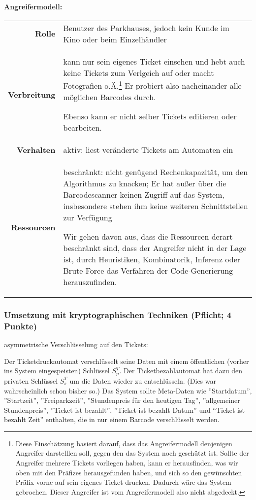 \documentclass{article}
\begin{document}
\paragraph{Angreifermodell:}
\begin{center}
	\begin{savenotes}	%
		\begin{tabular}{rp{}}
			\textbf{Rolle}			&	Benutzer des Parkhauses, jedoch kein Kunde im Kino oder beim Einzelhändler	\\
			\textbf{Verbreitung}	&	kann nur sein eigenes Ticket einsehen und hebt auch keine Tickets zum Verlgeich auf oder macht Fotografien o.Ä.\footnote{
											Diese Einschätzung basiert darauf, dass das Angreifermodell denjenigen Angreifer darstelllen soll, gegen den das System noch geschützt ist.
											Sollte der Angreifer mehrere Tickets vorliegen haben, kann er herausfinden, was wir oben mit den Präfizes herausgefunden haben, und sich so den gewünschten Präfix vorne auf sein eigenes Ticket drucken.
											Dadurch wäre das System gebrochen.
											Dieser Angreifer ist vom Angreifermodell also nicht abgedeckt.
										}
										Er probiert also nacheinander alle möglichen Barcodes durch.
										
										Ebenso kann er nicht selber Tickets editieren oder bearbeiten.	\\
			\textbf{Verhalten}		&	aktiv: liest veränderte Tickets am Automaten ein	\\
			\textbf{Ressourcen}		&	beschränkt: nicht genügend Rechenkapazität, um den Algorithmus zu knacken;
										Er hat außer über die Barcodescanner keinen Zugriff auf das System, insbesondere stehen ihm keine weiteren Schnittstellen zur Verfügung
										
										Wir gehen davon aus, dass die Ressourcen derart beschränkt sind, dass der Angreifer nicht in der Lage ist, durch Heuristiken, Kombinatorik, Inferenz oder Brute Force das Verfahren der Code-Generierung herauszufinden.
		\end{tabular}
	\end{savenotes}
\end{center}
\subsubsection{Umsetzung mit kryptographischen Techniken (Pflicht; 4 Punkte)}
asymmetrische Verschlüsselung auf den Tickets:

Der Ticketdruckautomat verschlüsselt seine Daten mit einem öffentlichen (vorher ins System eingespeisten) Schlüssel $S_p^T$.
Der Ticketbezahlautomat hat dazu den privaten Schlüssel $S_s^T$ um die Daten wieder zu entschlüsseln.
(Dies war wahrscheinlich schon bisher so.)
Das System sollte Meta-Daten wie ''Startdatum'', ''Startzeit'', ''Freiparkzeit'', ''Stundenpreis für den heutigen Tag'', ''allgemeiner Stundenpreis'', ''Ticket ist bezahlt'', ''Ticket ist bezahlt Datum” und “Ticket ist bezahlt Zeit'' enthalten, die in nur einem Barcode verschlüsselt werden.
\end{document}
